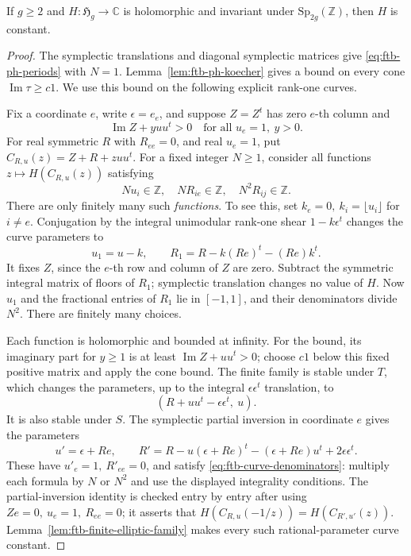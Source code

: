 \begin{srproposition}
\label{prop:ftb-ph-holo}
If \(g\geq2\) and \(H:\mathfrak H_g\to\mathbb C\) is holomorphic
and invariant under \(\mathrm{Sp}_{2g}(\mathbb Z)\), then \(H\)
is constant.
\end{srproposition}
\begin{proof}
The symplectic translations and diagonal symplectic matrices give
\eqref{eq:ftb-ph-periods} with \(N=1\).
Lemma~\ref{lem:ftb-ph-koecher} gives a bound on every cone
\(\operatorname{Im}\tau\geq c1\).
We use this bound on the following explicit rank-one curves.

Fix a coordinate \(e\), write \(\epsilon=e_e\), and suppose
\(Z=Z^t\) has zero \(e\)-th column and
\[
       \operatorname{Im}Z+yuu^t>0
                    \quad\text{for all }u_e=1,\ y>0.
\]
For real symmetric \(R\) with \(R_{ee}=0\), and real \(u_e=1\),
put \(C_{R,u}(z)=Z+R+zuu^t\).
For a fixed integer \(N\geq1\), consider all functions
\(z\mapsto H(C_{R,u}(z))\) satisfying
\[
    Nu_i\in\mathbb Z,\quad NR_{ie}\in\mathbb Z,\quad
                             N^2R_{ij}\in\mathbb Z.
 \tag{W8}\label{eq:ftb-curve-denominators}
\]
There are only finitely many such \emph{functions}.
To see this, set \(k_e=0,\ k_i=\lfloor u_i\rfloor\) for \(i\ne e\).
Conjugation by the integral unimodular rank-one shear
\(1-k\epsilon^t\) changes the curve parameters to
\[
 u_1=u-k,\qquad
 R_1=R-k(Re)^t-(Re)k^t .
\]
It fixes \(Z\), since the \(e\)-th row and column of \(Z\) are zero.
Subtract the symmetric integral matrix of floors of \(R_1\);
symplectic translation changes no value of \(H\).
Now \(u_1\) and the fractional entries of \(R_1\) lie in
\([-1,1]\), and their denominators divide \(N^2\).
There are finitely many choices.

Each function is holomorphic and bounded at infinity.
For the bound, its imaginary part for \(y\geq1\) is at least
\(\operatorname{Im}Z+uu^t>0\); choose \(c1\) below this fixed
positive matrix and apply the cone bound.
The finite family is stable under \(T\), which changes the
parameters, up to the integral \(\epsilon\epsilon^t\) translation,
to
\[
                         (R+uu^t-\epsilon\epsilon^t,\ u).
\]
It is also stable under \(S\).  The symplectic partial inversion
in coordinate \(e\) gives the parameters
\[
 u'=\epsilon+Re,\qquad
 R'=R-u(\epsilon+Re)^t-(\epsilon+Re)u^t
                                      +2\epsilon\epsilon^t.
 \tag{W9}\label{eq:ftb-curve-S}
\]
These have \(u'_e=1,\ R'_{ee}=0\), and satisfy
\eqref{eq:ftb-curve-denominators}: multiply each formula by \(N\)
or \(N^2\) and use the displayed integrality conditions.
The partial-inversion identity is checked entry by entry after
using \(Z e=0,\ u_e=1,\ R_{ee}=0\); it asserts that
\(H(C_{R,u}(-1/z))=H(C_{R',u'}(z))\).
Lemma~\ref{lem:ftb-finite-elliptic-family} makes every such
rational-parameter curve constant.


\end{proof}
